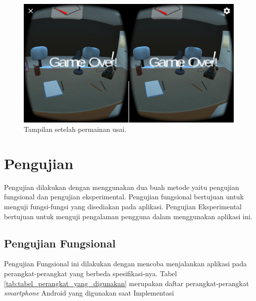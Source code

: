 \begin{enumerate}
    \begin{figure}[htbp]
    \centering
    \includegraphics[scale=0.23]{Gambar/screenshot-aplikasi/game-over.png}
    \caption{Tampilan setelah permainan usai.}
    \label{fig:ss_game_over}
    \end{figure}
    
\end{enumerate}

\section{Pengujian}

Pengujian dilakukan dengan menggunakan dua buah metode yaitu pengujian fungsional dan pengujian eksperimental. Pengujian fungsional bertujuan untuk menguji fungsi-fungsi yang disediakan pada aplikasi. Pengujian Eksperimental bertujuan untuk menguji pengalaman pengguna dalam menggunakan aplikasi ini.

\subsection{Pengujian Fungsional}

Pengujian Fungsional ini dilakukan dengan mencoba menjalankan aplikasi pada perangkat-perangkat yang berbeda spesifikasi-nya. Tabel \ref{tab:tabel_perangkat_yang_digunakan} merupakan daftar perangkat-perangkat \textit{smartphone} Android yang digunakan saat Implementasi


